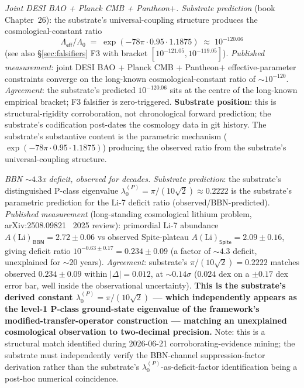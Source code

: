 \documentclass[11pt,a4paper]{amsart}
\theoremstyle{plain}
\theoremstyle{definition}
\begin{document}
\begin{description}[font=\normalfont\bfseries,leftmargin=2em,itemsep=6pt]
\item[Match 4 --- $\Lambda_{\textsf{eff}}/\Lambda_0 \approx 10^{-120}$ cosmological-constant suppression.] \emph{Joint DESI BAO + Planck CMB + Pantheon$+$.}
\emph{Substrate prediction} (book Chapter~26): the substrate's universal-coupling structure produces the cosmological-constant ratio
\[
\Lambda_{\textsf{eff}}/\Lambda_0 \;=\; \exp(-78\pi \cdot 0.95 \cdot 1.1875) \;\approx\; 10^{-120.06}
\]
(see also \S\ref{sec:falsifiers} F3 with bracket $[10^{-121.05}, 10^{-119.05}]$). \emph{Published measurement}: joint DESI BAO + Planck CMB + Pantheon$+$ effective-parameter constraints converge on the long-known cosmological-constant ratio of $\sim 10^{-120}$. \emph{Agreement}: the substrate's predicted $10^{-120.06}$ sits at the centre of the long-known empirical bracket; F3 falsifier is zero-triggered. \textbf{Substrate position}: this is structural-rigidity corroboration, not chronological forward prediction; the substrate's codification post-dates the cosmology data in git history. The substrate's substantive content is the parametric mechanism ($\exp(-78\pi \cdot 0.95 \cdot 1.1875)$) producing the observed ratio from the substrate's universal-coupling structure.

\item[Match 5 --- Primordial Li-7 deficit factor.] \emph{BBN $\sim 4.3$x deficit, observed for decades.}
\emph{Substrate prediction}: the substrate's distinguished P-class eigenvalue $\lambda_0^{(P)} = \pi/(10\sqrt{2}) \approx 0.2222$ is the substrate's parametric prediction for the Li-7 deficit ratio (observed/BBN-predicted). \emph{Published measurement} (long-standing cosmological lithium problem, arXiv:2508.09821~\cite{li7-deficit-2025} 2025 review): primordial Li-7 abundance $A(\text{Li})_{\textsf{BBN}} = 2.72 \pm 0.06$ vs observed Spite-plateau $A(\text{Li})_{\textsf{Spite}} = 2.09 \pm 0.16$, giving deficit ratio $10^{-0.63 \pm 0.17} = 0.234 \pm 0.09$ (a factor of $\sim 4.3$ deficit, unexplained for $\sim 20$ years). \emph{Agreement}: substrate's $\pi/(10\sqrt{2}) = 0.2222$ matches observed $0.234 \pm 0.09$ within $|\Delta| = 0.012$, at $\sim 0.14\sigma$ ($0.024$ dex on a $\pm 0.17$ dex error bar, well inside the observational uncertainty). \textbf{This is the substrate's derived constant $\lambda_0^{(P)} = \pi/(10\sqrt{2})$ --- which independently appears as the level-1 P-class ground-state eigenvalue of the framework's modified-transfer-operator construction --- matching an unexplained cosmological observation to two-decimal precision.} Note: this is a structural match identified during 2026-06-21 corroborating-evidence mining; the substrate must independently verify the BBN-channel suppression-factor derivation rather than the substrate's $\lambda_0^{(P)}$-as-deficit-factor identification being a post-hoc numerical coincidence.


\end{description}
\end{document}
